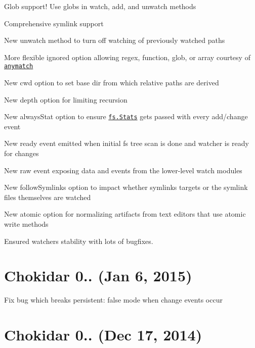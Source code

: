 \begin{DoxyItemize}
\item Glob support! Use globs in {\ttfamily watch}, {\ttfamily add}, and {\ttfamily unwatch} methods
\item Comprehensive symlink support
\item New {\ttfamily unwatch} method to turn off watching of previously watched paths
\item More flexible {\ttfamily ignored} option allowing regex, function, glob, or array courtesy of \href{https://github.com/es128/anymatch}{\tt anymatch}
\item New {\ttfamily cwd} option to set base dir from which relative paths are derived
\item New {\ttfamily depth} option for limiting recursion
\item New {\ttfamily always\+Stat} option to ensure \href{https://nodejs.org/api/fs.html#fs_class_fs_stats}{\tt {\ttfamily fs.\+Stats}} gets passed with every add/change event
\item New {\ttfamily ready} event emitted when initial fs tree scan is done and watcher is ready for changes
\item New {\ttfamily raw} event exposing data and events from the lower-\/level watch modules
\item New {\ttfamily follow\+Symlinks} option to impact whether symlinks\textquotesingle{} targets or the symlink files themselves are watched
\item New {\ttfamily atomic} option for normalizing artifacts from text editors that use atomic write methods
\item Ensured watcher\textquotesingle{}s stability with lots of bugfixes.
\end{DoxyItemize}

\section*{Chokidar 0.. (Jan 6, 2015)}


\begin{DoxyItemize}
\item Fix bug which breaks {\ttfamily persistent\+: false} mode when change events occur
\end{DoxyItemize}

\section*{Chokidar 0.. (Dec 17, 2014)}


